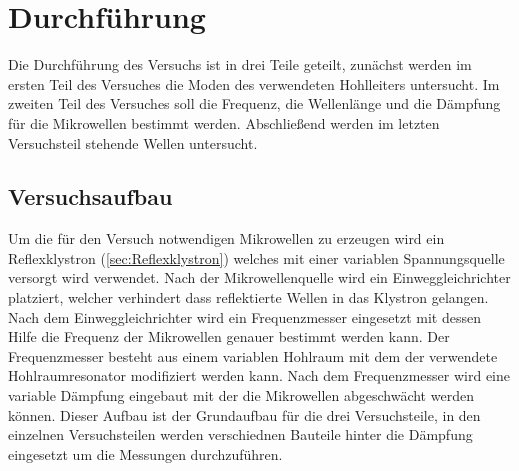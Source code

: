 \newpage
\section{Durchführung}
\label{sec:Durchfuehrung}
    Die Durchführung des Versuchs ist in drei Teile geteilt, zunächst werden im ersten Teil des Versuches die Moden des verwendeten Hohlleiters untersucht. Im zweiten Teil des Versuches soll die Frequenz, die Wellenlänge und die Dämpfung für die Mikrowellen bestimmt werden. Abschließend werden im letzten Versuchsteil stehende Wellen untersucht.
    \subsection{Versuchsaufbau}
        Um die für den Versuch notwendigen Mikrowellen zu erzeugen wird ein Reflexklystron (\ref{sec:Reflexklystron}) welches mit einer variablen Spannungsquelle versorgt wird verwendet.
        Nach der Mikrowellenquelle wird ein Einweggleichrichter platziert, welcher verhindert dass reflektierte Wellen in das Klystron gelangen.
        Nach dem Einweggleichrichter wird ein Frequenzmesser eingesetzt mit dessen Hilfe die Frequenz der Mikrowellen genauer bestimmt werden kann.
        Der Frequenzmesser besteht aus einem variablen Hohlraum mit dem der verwendete Hohlraumresonator modifiziert werden kann.
        Nach dem Frequenzmesser wird eine variable Dämpfung eingebaut mit der die Mikrowellen abgeschwächt werden können.
        Dieser Aufbau ist der Grundaufbau für die drei Versuchsteile, in den einzelnen Versuchsteilen werden verschiednen Bauteile hinter die Dämpfung eingesetzt um die Messungen durchzuführen.
